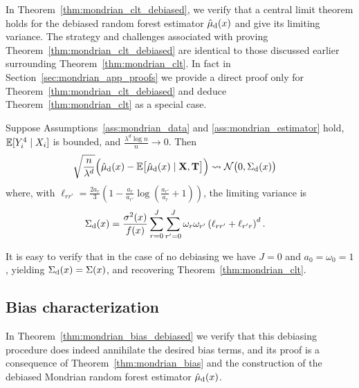 In Theorem~\ref{thm:mondrian_clt_debiased}, we verify that a central
limit theorem holds for the debiased
random forest estimator $\hat\mu_{\mathrm{d}}(x)$ and give its limiting variance.
The strategy and challenges associated with proving
Theorem~\ref{thm:mondrian_clt_debiased} are identical to those discussed earlier
surrounding Theorem~\ref{thm:mondrian_clt}. In fact in
Section~\ref{sec:mondrian_app_proofs}
we provide a direct proof only for Theorem~\ref{thm:mondrian_clt_debiased}
and deduce Theorem~\ref{thm:mondrian_clt} as a special case.

\begin{theorem}%
  \label{thm:mondrian_clt_debiased}
  Suppose Assumptions~\ref{ass:mondrian_data} and \ref{ass:mondrian_estimator}
  hold,
  $\mathbb{E}[Y_i^4 \mid X_i ]$ is bounded,
  and $\frac{\lambda^d \log n}{n} \to 0$. Then
  \begin{align*}
    \sqrt{\frac{n}{\lambda^d}}
    \Big(
      \hat \mu_{\mathrm{d}}(x)
      - \mathbb{E} \big[ \hat \mu_{\mathrm{d}}(x) \mid \mathbf{X}, \mathbf{T} \big]
    \Big)
    &\rightsquigarrow
    \mathcal{N}\big(0, \Sigma_{\mathrm{d}}(x)\big)
  \end{align*}
  where, with $\ell_{r r'} = \frac{2 a_r}{3} \left( 1 - \frac{a_{r}}{a_{r'}}
  \log\left(\frac{a_{r'}}{a_{r}} + 1\right) \right)$,
  the limiting variance is
  \begin{align*}
    \Sigma_{\mathrm{d}}(x)
    &=
    \frac{\sigma^2(x)}{f(x)}
    \sum_{r=0}^{J} \sum_{r'=0}^{J} \omega_r \omega_{r'}
    \left( \ell_{r r'} + \ell_{r' r} \right)^d.
  \end{align*}
\end{theorem}

It is easy to verify that in the case of no debiasing we have
$J=0$ and $a_0 = \omega_0 = 1$, yielding
$\Sigma_{\mathrm{d}}(x) = \Sigma(x)$, and recovering Theorem~\ref{thm:mondrian_clt}.

\subsection*{Bias characterization}

In Theorem~\ref{thm:mondrian_bias_debiased} we verify that this debiasing
procedure does indeed annihilate the desired bias terms, and its proof is a
consequence of Theorem~\ref{thm:mondrian_bias} and the construction of the
debiased Mondrian random forest estimator $\hat\mu_{\mathrm{d}}(x)$.

